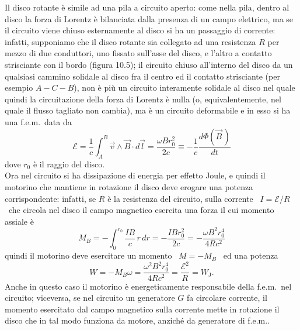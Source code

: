 \begin{enumerate}
    Il disco rotante \`e simile ad una pila a circuito aperto: come nella pila,
    dentro al disco la forza di Lorentz \`e bilanciata dalla presenza di un
    campo elettrico, ma se il circuito viene chiuso esternamente al disco si ha
    un passaggio di corrente: infatti, supponiamo che il disco rotante sia
    collegato ad una resistenza $R$ per mezzo di due conduttori, uno fissato
    sull'asse del disco, e l'altro a contatto strisciante con il bordo (figura
    10.5); il circuito chiuso all'interno del disco da un qualsiasi cammino
    solidale al disco fra il centro ed il contatto strisciante (per esempio
    $A-C-B$), non \`e pi\`u un circuito interamente solidale al disco nel quale
    quindi la circuitazione della forza di Lorentz \`e nulla (o,
    equivalentemente, nel quale il flusso tagliato non cambia), ma \`e un
    circuito deformabile e in esso si ha una f.e.m.\ data da
    \begin{equation}
      \mathcal E=\frac{1}{c}\int_A^B\vec v\wedge\vec B\cdot d\vec l
      =\frac{\omega Br_0^2}{2c}\equiv-\frac{1}{c}\frac{d\Phi(\vec B\,)}{dt}
      \tag{10.31}
    \end{equation}
    dove $r_0$ \`e il raggio del disco.\\
    Ora nel circuito si ha dissipazione di energia per effetto Joule, e quindi
    il motorino che mantiene in rotazione il disco deve erogare una potenza
    corrispondente: infatti, se $R$ \`e la resistenza del circuito, sulla
    corrente \ $I=\mathcal E/R$ \ che circola nel disco il campo magnetico
    esercita una forza il cui momento assiale \`e
    \begin{equation}
      M_B=-\int_0^{r_0}\frac{IB}{c}\,r\,dr
      =-\frac{IBr_0^2}{2c}=-\frac{\omega B^2r_0^4}{4Rc^2}
      \tag{10.32}
    \end{equation}
    quindi il motorino deve esercitare un momento \ $M=-M_B$ \ ed una potenza
    \begin{equation}
      W=-M_B\omega=\frac{\omega^2B^2r_0^4}{4Rc^2}
      =\frac{\mathcal E^2}{R}=W_\mathrm{J}.
      \tag{10.33}
    \end{equation}
    Anche in questo caso il motorino \`e energeticamente responsabile della
    f.e.m.\ nel circuito; viceversa, se nel circuito un generatore $G$ fa
    circolare corrente, il momento esercitato dal campo magnetico sulla corrente
    mette in rotazione il disco che in tal modo funziona da motore, anzich\'e da
    generatore di f.e.m..


\end{enumerate}
